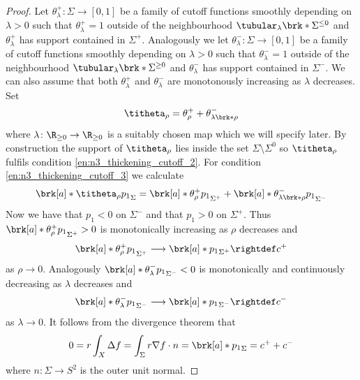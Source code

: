 \begin{proof}
  Let $\theta^+_\lambda\colon \Sigma\to[0,1]$ be a family of cutoff functions smoothly depending on $\lambda>0$ such that
  $\theta^+_\lambda=1$ outside of the neighbourhood $\tubular_{\lambda}\brk*{\Sigma^{\leq0}}$ and $\theta_\lambda^+$ has
  support contained in $\Sigma^+$.
  Analogously we let $\theta^-_\lambda\colon\Sigma\to[0,1]$ be a family of cutoff functions smoothly depending on $\lambda>0$
  such that $\theta^-_\lambda=1$ outside of the neighbourhood $\tubular_{\lambda}\brk*{\Sigma^{\geq0}}$ and $\theta_\lambda^-$ has
  support contained in $\Sigma^-$.
  We can also assume that both $\theta^+_\lambda$ and $\theta^-_\lambda$ are monotonously increasing as $\lambda$ decreases.
  Set 
  \begin{align}
    \titheta_\rho=\theta^+_\rho+\theta^-_{\lambda\brk*{\rho}}
    \label{eq:n3_thickening_cutoff_titheta}
  \end{align}
  where $\lambda\colon\R_{\geq0}\to\R_{\geq0}$
  is a suitably chosen map which we will specify later. By construction the support of $\titheta_\rho$ lies inside 
  the set $\Sigma\setminus\Sigma^0$ so $\titheta_\rho$ fulfils condition \ref{en:n3_thickening_cutoff_2}.
  For condition \ref{en:n3_thickening_cutoff_3}
  we calculate
  \begin{align}
    \brk[a]*{\titheta_\rho p_1}_\Sigma
    =\brk[a]*{\theta_\rho^+p_1}_{\Sigma^+}+\brk[a]*{\theta_{\lambda\brk*{\rho}}^-p_1}_{\Sigma^-}
    \label{eq:n3_thickening_cutoff_meanVal}
  \end{align}
  Now we have that $p_1<0$ on $\Sigma^-$ and that $p_1>0$ on $\Sigma^+$.
  Thus $\brk[a]*{\theta_\rho^+p_1}_{\Sigma^+}>0$ is monotonically increasing as $\rho$ decreases and
  \begin{align*}
    \brk[a]*{\theta_\rho^+p_1}_{\Sigma^+}\longrightarrow \brk[a]*{p_1}_{\Sigma^+}\rightdef c^+
  \end{align*}
  as $\rho\to0$.
  Analogously $\brk[a]*{\theta_{\lambda}^-p_1}_{\Sigma^-}<0$ is
  monotonically and continuously decreasing as $\lambda$ decreases and 
  \begin{align*}
    \brk[a]*{\theta_\lambda^-p_1}_{\Sigma^-}\longrightarrow \brk[a]*{p_1}_{\Sigma^-}\rightdef c^-
  \end{align*}
  as $\lambda\to0$. It follows from the divergence theorem that
  \begin{align*}
    0=r\int_X\Delta f=\int_\Sigma r\nabla f\cdot n=\brk[a]*{p_1}_\Sigma
    =c^++c^-
  \end{align*}
  where $n\colon\Sigma\to S^2$ is the outer unit normal.

\end{proof}
